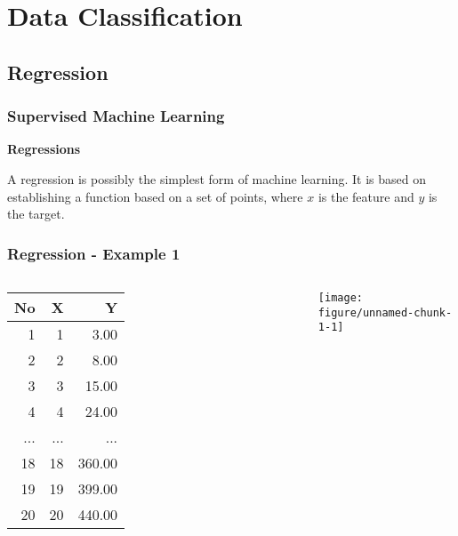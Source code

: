 \documentclass{beamer}\usepackage[]{graphicx}\usepackage[]{color}
\newenvironment{knitrout}{}{} %
\begin{document}

\section{Data Classification}
\subsection{Regression}
\begin{frame}[fragile] \frametitle{Supervised Machine Learning}
\textbf{Regressions}

A regression is possibly the simplest form of machine learning. It is based on establishing a function based on a set of points, where $x$ is the feature and $y$ is the target.

\end{frame}


\begin{frame}[fragile] \frametitle{Regression - Example 1}

\begin{columns}[c]

\begin{table}[ht]
\centering
\begin{tabular}{rrr}
  \hline
No & X & Y \\ 
  \hline
1 &   1 & 3.00 \\ 
  2 &   2 & 8.00 \\ 
  3 &   3 & 15.00 \\ 
  4 &   4 & 24.00 \\ 
  ...&   ... & ... \\
  18 &  18 & 360.00 \\ 
  19 &  19 & 399.00 \\ 
  20 &  20 & 440.00 \\ 
   \hline
\end{tabular}
\end{table}


\begin{knitrout}
\color{fgcolor}
\texttt{[image: figure/unnamed-chunk-1-1]} 

\end{knitrout}

\end{columns}
\end{frame}
\end{document}

